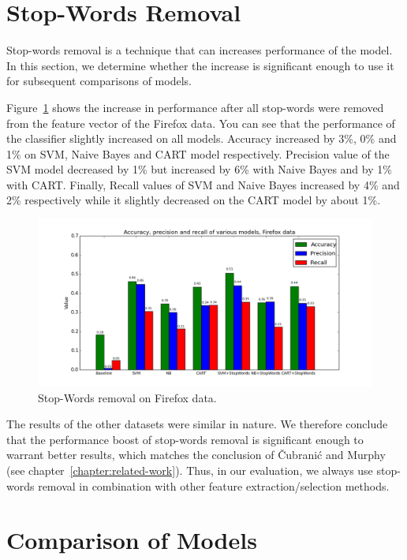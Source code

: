 \section{Stop-Words Removal}

Stop-words removal is a technique that can increases performance of the model. In this section, we determine whether the increase is significant enough to use it for subsequent comparisons of models.

Figure~\ref{fig:models.firefox.stopwords} shows the increase in performance after all stop-words were removed from the feature vector of the Firefox data. You can see that the performance of the classifier slightly increased on all models. Accuracy increased by 3\%, 0\% and 1\% on SVM, Naive Bayes and CART model respectively. Precision value of the SVM model decreased by 1\% but increased by 6\% with Naive Bayes and by 1\% with CART. Finally, Recall values of SVM and Naive Bayes increased by 4\% and 2\% respectively while it slightly decreased on the CART model by about 1\%.

\begin{figure}[htbp]
    \centering
        \includegraphics[width=\textwidth]{./images/comparison_of_models/firefox_0.png}
    \caption{Stop-Words removal on Firefox data.}
    \label{fig:models.firefox.stopwords}
\end{figure}

The results of the other datasets were similar in nature. We therefore conclude that the performance boost of stop-words removal is significant enough to warrant better results, which matches the conclusion of Čubranić and Murphy~\cite{Murphy} (see chapter~\ref{chapter:related-work}). Thus, in our evaluation, we always use stop-words removal in combination with other feature extraction/selection methods.

\section{Comparison of Models}

